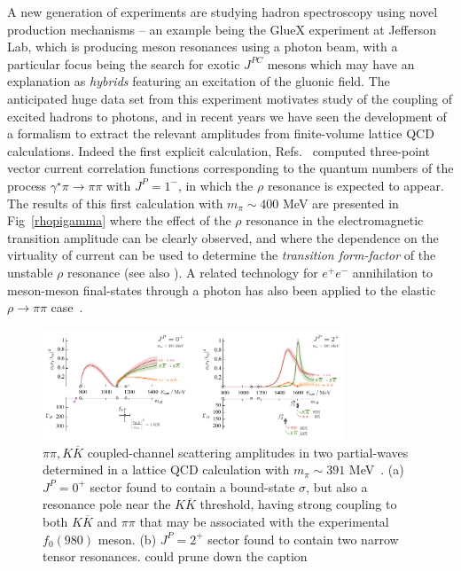 A new generation of experiments are studying hadron spectroscopy using novel production mechanisms -- an example being the GlueX experiment at Jefferson Lab, which is producing meson resonances using a photon beam, with a particular focus being the search for exotic $J^{PC}$  mesons which may have an explanation as \emph{hybrids} featuring an excitation of the gluonic field. The anticipated huge data set from this experiment motivates study of the coupling of excited hadrons to photons, and in recent years we have seen the development of a formalism to extract the relevant amplitudes from finite-volume lattice QCD calculations. Indeed the first explicit calculation, Refs.~\cite{Briceno:2015dca,Briceno:2016kkp} computed three-point vector current correlation functions corresponding to the quantum numbers of the process $\gamma^\star \pi \to \pi \pi$ with $J^P=1^-$, in which the $\rho$ resonance is expected to appear. The results of this first calculation with $m_\pi \sim 400$ MeV are presented in Fig~\ref{rhopigamma} where the effect of the $\rho$ resonance in the electromagnetic transition amplitude can be clearly observed, and where the dependence on the virtuality of current can be used to determine the \emph{transition form-factor} of the unstable $\rho$ resonance (see also \cite{Alexandrou:2018jbt}). A related technology for $e^+ e^-$ annihilation to meson-meson final-states through a photon has also been applied to the elastic $\rho \to \pi\pi$ case~\cite{Feng:2014gba}.

 
\begin{figure}
\includegraphics[width=0.8\textwidth]{figures/f0f2}
\caption{$\pi\pi, K\overline{K}$ coupled-channel scattering amplitudes in two partial-waves determined in a lattice QCD calculation with $m_\pi \sim 391$ MeV~\cite{Briceno:2017qmb}. (a) $J^P=0^+$ sector found to contain a bound-state $\sigma$, but also a resonance pole near the $K\overline{K}$ threshold, having strong coupling to both $K\overline{K}$ and $\pi\pi$ that may be associated with the experimental $f_0(980)$ meson. (b) $J^P=2^+$ sector found to contain two narrow tensor resonances. {\color{red} could prune down the caption}}
\label{f0f2}
\end{figure}


